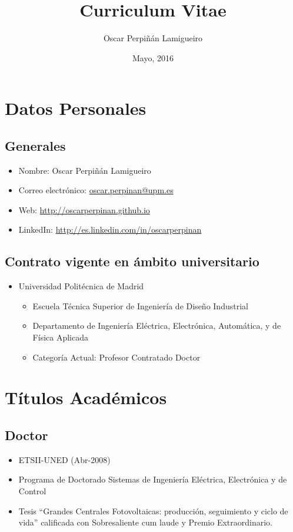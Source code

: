 \documentclass[article, a4paper]{memoir}
\author{Oscar Perpiñán Lamigueiro}
\date{Mayo, 2016}
\title{Curriculum Vitae}
\begin{document}
\maketitle

\section{Datos Personales}
\label{sec:orgheadline3}

\subsection{Generales}
\label{sec:orgheadline1}

\begin{itemize}
\item Nombre: Oscar Perpiñán Lamigueiro
\item Correo electrónico: \href{mailto:oscar.perpinan@upm.es}{oscar.perpinan@upm.es}
\item Web: \url{http://oscarperpinan.github.io}
\item LinkedIn: \url{http://es.linkedin.com/in/oscarperpinan}
\end{itemize}

\subsection{Contrato vigente en ámbito universitario}
\label{sec:orgheadline2}

\begin{itemize}
\item Universidad Politécnica de Madrid
\begin{itemize}
\item Escuela Técnica Superior de Ingeniería de Diseño Industrial
\item Departamento de Ingeniería Eléctrica, Electrónica, Automática, y de Física Aplicada
\item Categoría Actual: Profesor Contratado Doctor
\end{itemize}
\end{itemize}


\section{Títulos Académicos}
\label{sec:orgheadline6}

\subsection{Doctor}
\label{sec:orgheadline4}
\begin{itemize}
\item ETSII-UNED (Abr-2008)
\item Programa de Doctorado \guillemotleft{}Sistemas de Ingeniería Eléctrica, Electrónica y de Control\guillemotright{}
\item Tesis ``Grandes Centrales Fotovoltaicas: producción, seguimiento y ciclo de vida'' calificada con Sobresaliente cum laude y Premio Extraordinario.
\end{itemize}
\end{document}

